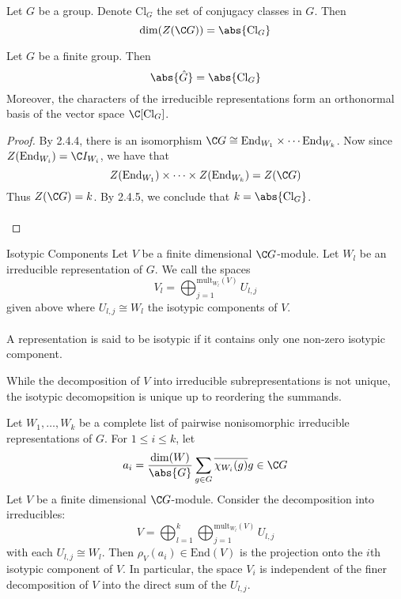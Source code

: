 \documentclass[a4paper]{article}
\begin{document}
\begin{prp}{}{} Let $G$ be a group. Denote $\text{Cl}_G$ the set of conjugacy classes in $G$. Then $$\dim(Z(\C G))=\abs{\text{Cl}_G}$$
\end{prp}

\begin{thm}{}{} Let $G$ be a finite group. Then $$\abs{\hat{G}}=\abs{\text{Cl}_G}$$ Moreover, the characters of the irreducible representations form an orthonormal basis of the vector space $\C[\text{Cl}_G]$. \tcbline
\begin{proof}
By 2.4.4, there is an isomorphism $\C G\cong\text{End}_{W_1}\times\cdots\text{End}_{W_k}$. Now since $Z(\text{End}_{W_i})=\C I_{W_i}$, we have that $$Z(\text{End}_{W_1})\times\cdots\times Z(\text{End}_{W_k})=Z(\C G)$$ Thus $Z(\C G)=k$. By 2.4.5, we conclude that $k=\abs{\text{Cl}_G}$. \\~\\
\end{proof}
\end{thm}

\begin{defn}{Isotypic Components}{} Let $V$ be a finite dimensional $\C G$-module. Let $W_l$ be an irreducible representation of $G$. We call the spaces $$V_l=\bigoplus_{j=1}^{\text{mult}_{W_l}(V)}U_{l,j}$$ given above where $U_{l,j}\cong W_l$ the isotypic components of $V$. \\~\\

A representation is said to be isotypic if it contains only one non-zero isotypic component. 
\end{defn}

While the decomposition of $V$ into irreducible subrepresentations is not unique, the isotypic decomopsition is unique up to reordering the summands. 

\begin{thm}{}{} Let $W_1,\dots,W_k$ be a complete list of pairwise nonisomorphic irreducible representations of $G$. For $1\leq i\leq k$, let $$a_i=\frac{\dim(W)}{\abs{G}}\sum_{g\in G}\overline{\chi_{W_i}(g)}g\in\C G$$ Let $V$ be a finite dimensional $\C G$-module. Consider the decomposition into irreducibles: $$V=\bigoplus_{l=1}^k\bigoplus_{j=1}^{\text{mult}_{W_l}(V)}U_{l,j}$$ with each $U_{l,j}\cong W_l$. Then $\rho_V(a_i)\in\text{End}(V)$ is the projection onto the $i$th isotypic component of $V$. In particular, the space $V_i$ is independent of the finer decomposition of $V$ into the direct sum of the $U_{l,j}$. 
\end{thm}
\end{document}
